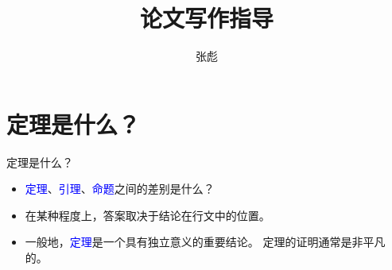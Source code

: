\documentclass[fontset=mac]{ctexbeamer}
\newcommand{\blue}[1]{\textcolor{blue}{#1}}
\begin{document}
\title[]{论文写作指导}
\author[]{{\large 张彪} }

\date{}






\begin{frame}
\maketitle
\end{frame}


\section{定理是什么？}
\begin{frame}{定理是什么？}

	
%
%
\begin{itemize}
\item \blue{定理}、\blue{引理}、\blue{命题}之间的差别是什么？
\item 在某种程度上，答案取决于结论在行文中的位置。
\item 
一般地，\blue{定理}是一个具有独立意义的重要结论。
定理的证明通常是非平凡的。


\end{itemize}



\end{frame}
\end{document}
